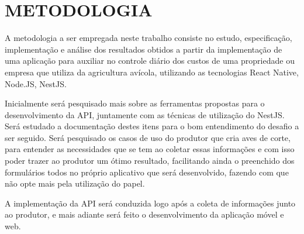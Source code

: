 
\chapter{METODOLOGIA}
\label{chap:metodologia}

A metodologia a ser empregada neste trabalho consiste no estudo, especificação, implementação e análise dos resultados obtidos a partir da implementação de uma aplicação para auxiliar no controle diário dos custos de uma propriedade ou empresa que utiliza da agricultura avícola, utilizando as tecnologias React Native, Node.JS, NestJS.



Inicialmente será pesquisado mais sobre as ferramentas propostas para o desenvolvimento da API, juntamente com as técnicas de utilização do NestJS. Será estudado a documentação destes itens para o bom entendimento do desafio a ser seguido. Será pesquisado os casos de uso do produtor que cria aves de corte, para entender as necessidades que se tem ao coletar essas informações e com isso poder trazer ao produtor um ótimo resultado, facilitando ainda o preenchido dos formulários todos no próprio aplicativo que será desenvolvido, fazendo com que não opte mais pela utilização do papel. 

A implementação da API será conduzida logo após a coleta de informações junto ao produtor, e mais adiante será feito o desenvolvimento da aplicação móvel e web.
